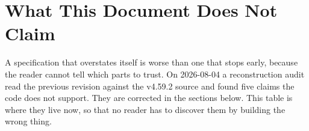 \documentclass[nobib]{tufte-handout}
\begin{document}

\section{What This Document Does Not Claim}\label{sec:notclaimed}

A specification that overstates itself is worse than one that stops early,
because the reader cannot tell which parts to trust. On 2026-08-04 a
reconstruction audit read the previous revision against the v4.59.2 source
and found five claims the code does not support. They are corrected in the
sections below. This table is where they live now, so that no reader has
to discover them by building the wrong thing.
\end{document}
